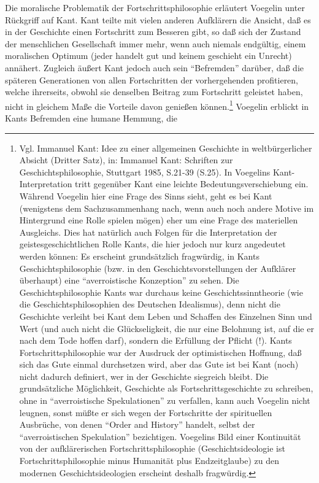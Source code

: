 Die moralische Problematik der Fortschrittsphilosophie erläutert Voegelin
unter Rückgriff auf Kant. Kant teilte mit vielen anderen Aufklärern die
Ansicht, daß es in der Geschichte einen Fortschritt zum Besseren gibt, so daß
sich der Zustand der menschlichen Gesellschaft immer mehr, wenn auch niemals
endgültig, einem moralischen Optimum (jeder handelt gut und keinem geschieht
ein Unrecht) annähert. Zugleich äußert Kant jedoch auch sein "`Befremden"'
darüber, daß die späteren Generationen von allen Fortschritten der
vorhergehenden profitieren, welche ihrerseits, obwohl sie denselben Beitrag
zum Fortschritt geleistet haben, nicht in gleichem Maße die Vorteile davon
genießen können.\footnote{Vgl. Immanuel Kant: Idee zu einer allgemeinen
  Geschichte in weltbürgerlicher Absicht (Dritter Satz), in: Immanuel Kant:
  Schriften zur Geschichtsphilosophie, Stuttgart 1985, S.21-39 (S.25). In
  Voegelins Kant-Interpretation tritt gegenüber Kant eine leichte
  Bedeutungsverschiebung ein. Während Voegelin hier eine Frage des Sinns
  sieht, geht es bei Kant (wenigstens dem Sachzusammenhang nach, wenn auch
  noch andere Motive im Hintergrund eine Rolle spielen mögen) eher um eine
  Frage des materiellen Ausgleichs.  Dies hat natürlich auch Folgen für die
  Interpretation der geistesgeschichtlichen Rolle Kants, die hier jedoch nur
  kurz angedeutet werden können: Es erscheint grundsätzlich fragwürdig, in
  Kants Geschichtsphilosophie (bzw. in den Geschichtsvorstellungen der
  Aufklärer überhaupt) eine "`averroistische Konzeption"' zu sehen. Die
  Geschichtsphilosophie Kants war durchaus keine Geschichtssinntheorie (wie
  die Geschichtsphilosophien des Deutschen Idealismus), denn nicht die
  Geschichte verleiht bei Kant dem Leben und Schaffen des Einzelnen Sinn und
  Wert (und auch nicht die Glückseligkeit, die nur eine Belohnung
  ist, auf die er nach dem Tode hoffen darf), sondern die Erfüllung der Pflicht
  (!). Kants Fortschrittsphilosophie war der Ausdruck der optimistischen
  Hoffnung, daß sich das Gute einmal durchsetzen wird, aber das Gute ist bei
  Kant (noch) nicht dadurch definiert, wer in der Geschichte siegreich bleibt.
  Die grundsätzliche Möglichkeit, Geschichte als Fortschrittsgeschichte zu
  schreiben, ohne in "`averroistische Spekulationen"' zu verfallen, kann auch
  Voegelin nicht leugnen, sonst müßte er sich wegen der Fortschritte der
  spirituellen Ausbrüche, von denen "`Order and History"' handelt, selbst der
  "`averroistischen Spekulation"' bezichtigen. Voegelins Bild einer
  Kontinuität von der aufklärerischen Fortschrittsphilosophie
  (Geschichtsideologie ist Fortschrittsphilosophie minus Humanität plus
  Endzeitglaube) zu den modernen Geschichtsideologien erscheint deshalb
  fragwürdig.} Voegelin erblickt in Kants Befremden eine humane Hemmung, die
